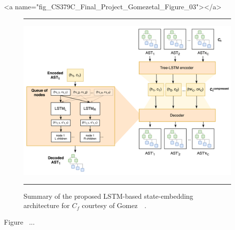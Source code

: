 
\setcounter{figure}{2}


\rawhtml
<a name="fig_CS379C_Final_Project_Gomezetal_Figure_03"></a>
\endrawhtml
\begin{figure}
%
  \hrule{}
%
  \begin{center}
    \includegraphics[width=11.0in]{./figures/CS379C_Final_Project_Gomezetal_Figure_03.png}
  \end{center}
%
  \caption{Summary of the proposed LSTM-based state-embedding architecture for $C_{f}$ \emdash{} courtesy of Gomez~\etal{}~\cite{CS379C_Final_Project_Gomezetal-18}.}
%
  \hrule{}
%
\end{figure}


Figure~{} ... 


